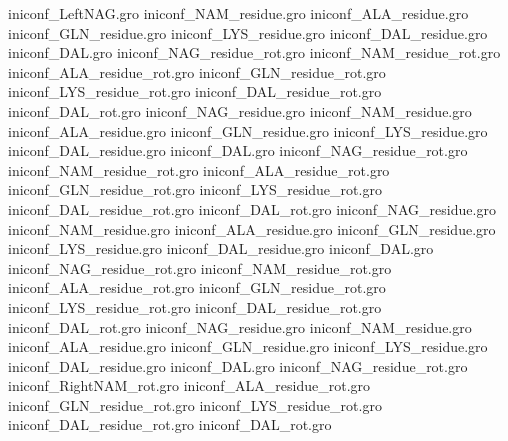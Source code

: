 iniconf_LeftNAG.gro
iniconf_NAM_residue.gro
iniconf_ALA_residue.gro
iniconf_GLN_residue.gro
iniconf_LYS_residue.gro
iniconf_DAL_residue.gro
iniconf_DAL.gro
iniconf_NAG_residue_rot.gro
iniconf_NAM_residue_rot.gro
iniconf_ALA_residue_rot.gro
iniconf_GLN_residue_rot.gro
iniconf_LYS_residue_rot.gro
iniconf_DAL_residue_rot.gro
iniconf_DAL_rot.gro
iniconf_NAG_residue.gro
iniconf_NAM_residue.gro
iniconf_ALA_residue.gro
iniconf_GLN_residue.gro
iniconf_LYS_residue.gro
iniconf_DAL_residue.gro
iniconf_DAL.gro
iniconf_NAG_residue_rot.gro
iniconf_NAM_residue_rot.gro
iniconf_ALA_residue_rot.gro
iniconf_GLN_residue_rot.gro
iniconf_LYS_residue_rot.gro
iniconf_DAL_residue_rot.gro
iniconf_DAL_rot.gro
iniconf_NAG_residue.gro
iniconf_NAM_residue.gro
iniconf_ALA_residue.gro
iniconf_GLN_residue.gro
iniconf_LYS_residue.gro
iniconf_DAL_residue.gro
iniconf_DAL.gro
iniconf_NAG_residue_rot.gro
iniconf_NAM_residue_rot.gro
iniconf_ALA_residue_rot.gro
iniconf_GLN_residue_rot.gro
iniconf_LYS_residue_rot.gro
iniconf_DAL_residue_rot.gro
iniconf_DAL_rot.gro
iniconf_NAG_residue.gro
iniconf_NAM_residue.gro
iniconf_ALA_residue.gro
iniconf_GLN_residue.gro
iniconf_LYS_residue.gro
iniconf_DAL_residue.gro
iniconf_DAL.gro
iniconf_NAG_residue_rot.gro
iniconf_RightNAM_rot.gro
iniconf_ALA_residue_rot.gro
iniconf_GLN_residue_rot.gro
iniconf_LYS_residue_rot.gro
iniconf_DAL_residue_rot.gro
iniconf_DAL_rot.gro

